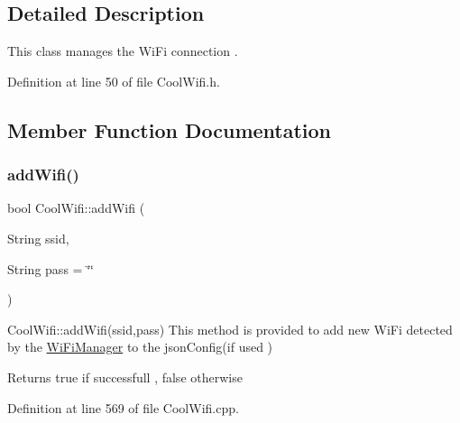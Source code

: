 \subsection{Detailed Description}
This class manages the Wi\+Fi connection . 

Definition at line 50 of file Cool\+Wifi.\+h.



\subsection{Member Function Documentation}
\mbox{\label{class_cool_wifi_a914d7a1df14dd6b75345fb614c34e9d6}} 
\subsubsection{\texorpdfstring{add\+Wifi()}{addWifi()}}
{\footnotesize\ttfamily bool Cool\+Wifi\+::add\+Wifi (\begin{DoxyParamCaption}\item[{String}]{ssid,  }\item[{String}]{pass = {\ttfamily \char`\"{}\char`\"{}} }\end{DoxyParamCaption})}

Cool\+Wifi\+::add\+Wifi(ssid,pass) This method is provided to add new Wi\+Fi detected by the \hyperlink{class_wi_fi_manager}{Wi\+Fi\+Manager} to the json\+Config(if used )

\begin{DoxyReturn}{Returns}
true if successfull , false otherwise 
\end{DoxyReturn}


Definition at line 569 of file Cool\+Wifi.\+cpp.


